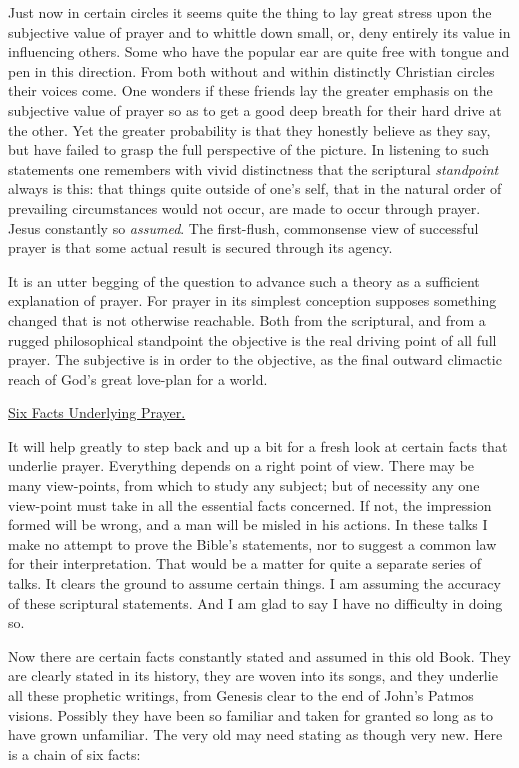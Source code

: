 Just now in certain circles it seems quite the thing to lay great stress
upon the subjective value of prayer and to whittle down small, or, deny
entirely its value in influencing others. Some who have the popular ear
are quite free with tongue and pen in this direction. From both without
and within distinctly Christian circles their voices come. One wonders if
these friends lay the greater emphasis on the subjective value of prayer
so as to get a good deep breath for their hard drive at the other. Yet the
greater probability is that they honestly believe as they say, but have
failed to grasp the full perspective of the picture. In listening to such
statements one remembers with vivid distinctness that the scriptural
\textit{standpoint} always is this: that things quite outside of one's self, that
in the natural order of prevailing circumstances would not occur, are made
to occur through prayer. Jesus constantly so \textit{assumed}. The first-flush,
commonsense view of successful prayer is that some actual result is
secured through its agency.

It is an utter begging of the question to advance such a theory as a
sufficient explanation of prayer. For prayer in its simplest conception
supposes something changed that is not otherwise reachable. Both from the
scriptural, and from a rugged philosophical standpoint the objective is
the real driving point of all full prayer. The subjective is in order to
the objective, as the final outward climactic reach of God's great
love-plan for a world.



\underline{Six Facts Underlying Prayer.}


It will help greatly to step back and up a bit for a fresh look at certain
facts that underlie prayer. Everything depends on a right point of view.
There may be many view-points, from which to study any subject; but of
necessity any one view-point must take in all the essential facts
concerned. If not, the impression formed will be wrong, and a man will be
misled in his actions. In these talks I make no attempt to prove the
Bible's statements, nor to suggest a common law for their interpretation.
That would be a matter for quite a separate series of talks. It clears the
ground to assume certain things. I am assuming the accuracy of these
scriptural statements. And I am glad to say I have no difficulty in doing
so.

Now there are certain facts constantly stated and assumed in this old
Book. They are clearly stated in its history, they are woven into its
songs, and they underlie all these prophetic writings, from Genesis clear
to the end of John's Patmos visions. Possibly they have been so familiar
and taken for granted so long as to have grown unfamiliar. The very old
may need stating as though very new. Here is a chain of six facts:

